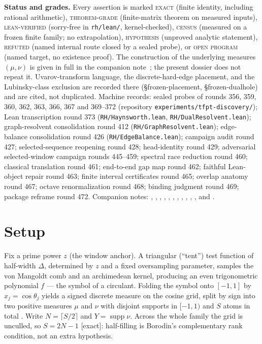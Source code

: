 \documentclass[11pt]{article}
\theoremstyle{remark}
\newcommand{\gr}[1]{\textnormal{\small[#1]}}
\begin{document}
\medskip\noindent
\textbf{Status and grades.}\enspace
Every assertion is marked
\textsc{exact} (finite identity, including rational arithmetic),
\textsc{theorem-grade} (finite-matrix theorem on measured inputs),
\textsc{lean-verified} (sorry-free in \texttt{rh/lean/}, kernel-checked),
\textsc{census} (measured on a frozen finite family; no
extrapolation),
\textsc{hypothesis} (unproved analytic statement),
\textsc{refuted} (named internal route closed by a sealed probe),
or \textsc{open program} (named target, no existence proof).
The construction of the underlying measures $(\mu,\nu)$ is given in
full in the companion note~\cite{lstar-note}; the present dossier
does not repeat it.  Uvarov-transform language, the discrete-hard-edge
placement, and the Lubinsky-class exclusion are recorded there
(\S{}frozen-placement, \S{}frozen-dualhole) and are cited, not
duplicated.  Machine records: sealed probes of rounds
356, 359, 360, 362, 363, 366, 367 and 369--372 (repository
\texttt{experiments/tfpt-discovery/}); Lean transcription round 373
(\texttt{RH/Haynsworth.lean}, \texttt{RH/DualResolvent.lean});
graph-resolvent consolidation round 412
(\texttt{RH/GraphResolvent.lean});
edge-balance consolidation round 426
(\texttt{RH/EdgeBalance.lean});
campaign audit round 427; selected-sequence reopening round 428;
head-identity round 429; adversarial selected-window campaign
rounds 445--459; spectral race reduction round 460; classical
translation round 461; end-to-end gap map round 462; faithful
Lean-object repair round 463; finite interval certificates round
465; overlap anatomy round 467; octave renormalization round 468;
binding judgment round 469; package reframe round 472.  Companion notes:
, ,
, ,
, ,
, ,
, ,
, and .

\section{Setup}\label{sec:setup}

Fix a prime power $z$ (the window anchor).  A triangular (``tent'')
test function of half-width $\Delta$, determined by $z$ and a fixed
oversampling parameter, samples the von Mangoldt comb and an
archimedean kernel, producing an even trigonometric polynomial
$f$ --- the symbol of a circulant.  Folding the symbol onto $[-1,1]$
by $x_{j}=\cos\theta_{j}$ yields a signed discrete measure on the
cosine grid, split by sign into two positive measures $\mu$ and
$\nu$ with disjoint supports in $[-1,1)$ and $S$ atoms in total
\cite[construction]{lstar-note}.  Write $N=\lceil S/2\rceil$ and
$Y=\operatorname{supp}\nu$.  Across the whole family the grid is
unculled, so $S=2N-1$ \gr{exact}: half-filling is Borodin's
complementary rank condition, not an extra hypothesis.
\end{document}
